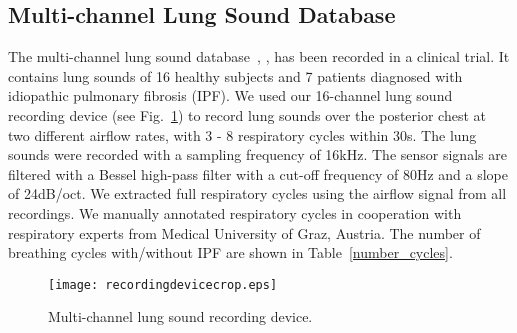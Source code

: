 \documentclass[journal]{IEEEtran}
\begin{document}
\subsection{Multi-channel Lung Sound Database}
The multi-channel lung sound database~\cite{messner2016robust}, \cite{messner2018crackle}, \cite{messner2020multi} has been recorded in a clinical trial. It contains lung sounds of 16 healthy subjects and 7 patients diagnosed with idiopathic pulmonary fibrosis (IPF). We used our 16-channel lung sound recording device (see Fig.~\ref{fig:recordingdevice}) to record lung sounds over the posterior chest at two different airflow rates, with 3 - 8 respiratory cycles within 30s. The lung sounds were recorded with a sampling frequency of 16kHz. The sensor signals are filtered with a Bessel high-pass filter with a cut-off frequency of 80Hz and a slope of 24dB/oct. We extracted full respiratory cycles using the airflow signal from all recordings. We manually annotated respiratory cycles in cooperation with respiratory experts from Medical University of Graz, Austria. The number of breathing cycles with/without IPF are shown in Table~\ref{number_cycles}.
\begin{figure}[t]
\centering
\texttt{[image: recordingdevicecrop.eps]}
\caption{Multi-channel lung sound recording device.}
\label{fig:recordingdevice}
\end{figure}

\begin{table}[h]
    \renewcommand{\arraystretch}{1.3}
    \caption{Number of subjects and cycles in the dataset}
    \label{number_cycles}
    \centering
\end{table}
\end{document}
